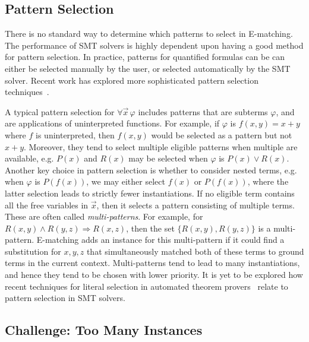 \documentclass[oribibl]{llncs}
\begin{document}
\subsection{Pattern Selection}
There is no standard way to determine which patterns to select in E-matching.
The performance of SMT solvers is highly dependent upon having a good method for pattern selection.
In practice, patterns for quantified formulas can be can either be selected manually by the user,
or selected automatically by the SMT solver.
Recent work has explored more sophisticated pattern selection techniques~\cite{DBLP:conf/cav/LeinoP16}.

A typical pattern selection for $\forall \vec x\, \varphi$ includes patterns that are subterms $\varphi$,
and are applications of uninterpreted functions.
For example, if $\varphi$ is $f( x, y ) = x + y$ where $f$ is uninterpreted, then $f( x, y )$ would be selected as a pattern
but not $x + y$.
Moreover, they tend to select multiple eligible patterns when multiple are available, 
e.g. $P( x )$ and $R( x )$ may be selected when $\varphi$ is $P( x ) \vee R( x )$.
Another key choice in pattern selection is whether to consider nested terms, e.g. when $\varphi$ is $P( f( x ) )$,
we may either select $f( x )$ or $P( f( x ) )$, where the latter selection leads to strictly fewer instantiations.
If no eligible term contains all the free variables in $\vec x$, then it selects a pattern consisting of multiple terms.
These are often called \emph{multi-patterns}.
For example, for $R( x, y ) \wedge R( y, z ) \Rightarrow R( x, z )$, then the set $\{ R( x, y ), R( y, z ) \}$ is a multi-pattern.
E-matching adds an instance for this multi-pattern if it could find a substitution for $x, y, z$
that simultaneously matched both of these terms to ground terms in the current context.
Multi-patterns tend to lead to many instantiations, and hence they tend to be chosen with lower priority.
It is yet to be explored how recent techniques for literal selection in automated theorem provers~\cite{DBLP:conf/cade/HoderR0V16}
relate to pattern selection in SMT solvers.

\subsection{Challenge: Too Many Instances}
\end{document}
